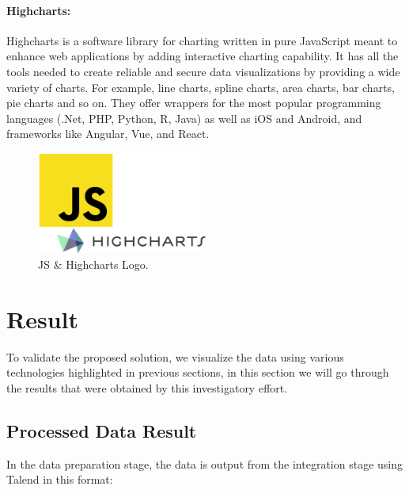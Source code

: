 \paragraph*{Highcharts:}
Highcharts is a software library for charting written in pure JavaScript meant to enhance web applications by adding interactive charting capability. 
It has all the tools needed to create reliable and secure data visualizations by
providing a wide variety of charts. For example, line charts, spline charts, area charts, bar charts, pie charts and so on. They offer wrappers for the most popular programming languages (.Net, PHP, Python, R, Java) as well as iOS and Android, and frameworks like Angular, Vue, and React\cite{InteractiveJavascriptCharts}. 
\begin{figure}[h!]
    \center
    \includegraphics[width=0.50\textwidth]{images/chapter4/jshigh.png}
    \caption{JS \& Highcharts Logo.}
    \label{fig:Highcharts}
\end{figure}

\section{Result}
To validate the proposed solution, we visualize the data  using various technologies highlighted in previous sections, in this section we will go through the results that were obtained by this investigatory effort.
\subsection{Processed Data Result}
In the data preparation stage, the data is output from the integration stage using Talend in this format:


